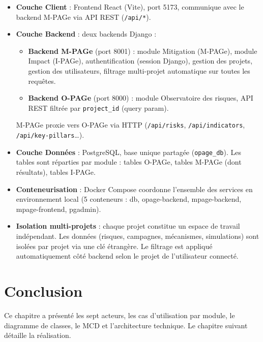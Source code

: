 \begin{itemize}
    \item \textbf{Couche Client} : Frontend React (Vite), port 5173, communique avec le backend M-PAGe via API REST (\texttt{/api/*}).
    \item \textbf{Couche Backend} : deux backends Django :
    \begin{itemize}
        \item \textbf{Backend M-PAGe} (port 8001) : module Mitigation (M-PAGe), module Impact (I-PAGe), authentification (session Django), gestion des projets, gestion des utilisateurs, filtrage multi-projet automatique sur toutes les requêtes.
        \item \textbf{Backend O-PAGe} (port 8000) : module Observatoire des risques, API REST filtrée par \texttt{project\_id} (query param).
    \end{itemize}
    M-PAGe proxie vers O-PAGe via HTTP (\texttt{/api/risks}, \texttt{/api/indicators},\\ \texttt{/api/key-pillars}\ldots).
    \item \textbf{Couche Données} : PostgreSQL, base unique partagée (\texttt{opage\_db}). Les tables sont réparties par module : tables O-PAGe, tables M-PAGe (dont résultats), tables I-PAGe.
    \item \textbf{Conteneurisation} : Docker Compose coordonne l'ensemble des services en environnement local (5 conteneurs : db, opage-backend, mpage-backend, mpage-frontend, pgadmin).
    \item \textbf{Isolation multi-projets} : chaque projet constitue un espace de travail indépendant. Les données (risques, campagnes, mécanismes, simulations) sont isolées par projet via une clé étrangère. Le filtrage est appliqué automatiquement côté backend selon le projet de l'utilisateur connecté.
\end{itemize}

\section{Conclusion}
Ce chapitre a présenté les sept acteurs, les cas d'utilisation par module, le diagramme de classes, le MCD et l'architecture technique. Le chapitre suivant détaille la réalisation.
